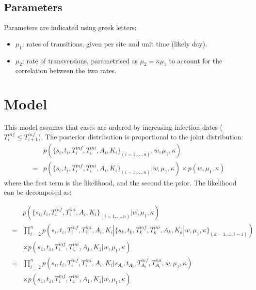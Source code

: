 \documentclass[10pt]{article}
\begin{document}
\subsection*{Parameters}
Parameters are indicated using greek letters:
\begin{itemize}
	\item $\mu_1$: rates of transitions, given per site and unit time (likely day).
	\item $\mu_2 $: rate of transversions, parametrised as $\mu_2 = \kappa \mu_1$ to account for the correlation between the two rates.
\end{itemize}






\section*{Model}
This model assumes that cases are ordered by increasing infection dates ($T_i^{inf} \leq T_{i+1}^{inf}$).
The posterior distribution is proportional to the joint distribution:
\begin{eqnarray}
& & p(\{s_i, t_i, T_i^{inf},T_i^{ini}, A_i, K_i\}_{(i=1,\ldots,n)}, w, \mu_1, \kappa)\\
& = & p(\{s_i, t_i, T_i^{inf},T_i^{ini}, A_i, K_i\}_{(i=1,\ldots,n)}| w, \mu_1, \kappa) \times p(w, \mu_1, \kappa)
\end{eqnarray}
where the first term is the likelihood, and the second the prior.
The likelihood can be decomposed as:

\begin{eqnarray}
& & p(\{s_i, t_i, T_i^{inf},T_i^{ini}, A_i, K_i\}_{(i=1,\ldots,n)}| w, \mu_1, \kappa) \\
& = & \prod_{i=2}^n p(s_i, t_i, T_i^{inf},T_i^{ini}, A_i, K_i | \{s_k, t_k, T_k^{inf},T_k^{ini}, A_k, K_k | w, \mu_1, \kappa\}_{(k=1,\ldots,i-1)}) \nonumber \\ 
& & \times p(s_1, t_1, T_1^{inf}, T_1^{ini}, A_1, K_1 | w, \mu_1, \kappa)\\
& = & \prod_{i=2}^n p(s_i, t_i, T_i^{inf},T_i^{ini}, A_i, K_i| s_{A_i}, t_{A_i}, T_{A_i}^{inf}, T_{A_i}^{ini}, w, \mu_1, \kappa) \nonumber \\
& & \times p(s_1, t_1, T_1^{inf}, T_1^{ini},A_1, K_1 | w, \mu_1, \kappa)
\end{eqnarray}
\end{document}
